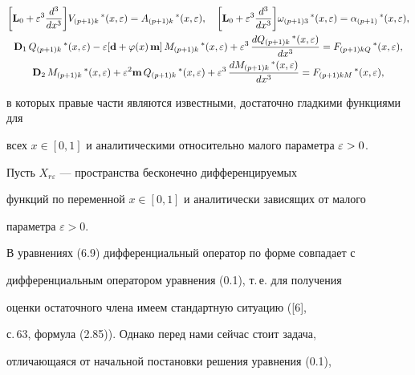 \begin{gather}


\bigg[\bold{L}_0 + \e^3 \frac{d^3}{d x^3} \bigg] V_{(p+1)k}\, ^* (x, \e)=


A_{(p+1)k}\, ^* (x, \e),


\quad \bigg[\bold{L}_0 + \e^3 \frac{d^3}{d x^3} \bigg]


\omega_{(p+1)3}\, ^* (x, \e) = \alpha_{(p+1)} \,^* (x, \e), \\


%


\bold{D}_1\, Q_{(p+1)k} \,^* (x, \e) - \varepsilon [\bold{d} +


\varphi (x)\, \bold{m}]\, M_{(p+1)k} \,^* (x, \e) +


\varepsilon^3\,\frac{d Q_{(p+1)k} \,^* (x, \e)}{d x^3}=


F_{(p+1)kQ}\,^* (x, \e), \notag \\


%


\bold{D}_2\, M_{(p+1)k} \,^* (x, \e)+ \varepsilon^2 \bold{m}


\, Q_{(p+1)k} \,^* (x, \e) + \varepsilon^3\,\frac{d M_{(p+1)k}\,^*


(x, \e)}{d x^3}= F_{(p+1)kM}\,^* (x, \e),


\end{gather}


в которых правые части являются известными, достаточно гладкими функциями для


всех $ x\in[0,1]$ и аналитическими относительно малого параметра $ \varepsilon > 0$.





Пусть $ X_{r \varepsilon}$ --- пространства бесконечно дифференцируемых


функций по переменной $ x \in [0,1]$ и аналитически зависящих от малого


параметра $\varepsilon > 0$.





В уравнениях (6.9) дифференциальный оператор по форме совпадает с


дифференциальным оператором уравнения (0.1), т.\,е. для получения


оценки остаточного члена имеем стандартную ситуацию ([6],


с.\,63, формула (2.85)). Однако перед нами сейчас стоит задача,


отличающаяся от начальной постановки решения уравнения (0.1),


